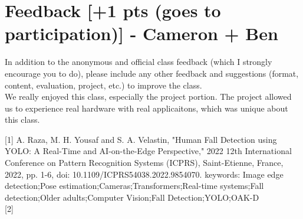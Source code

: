 \documentclass[sigconf,authorversion,nonacm]{acmart}
\begin{document}
\section{Feedback {\small {[+1 pts (goes to participation)]}} - Cameron + Ben}  
In addition to the anonymous and official class feedback (which I strongly encourage you to do), please include any other feedback and suggestions (format, content, evaluation, project, etc.) to improve the class. \\

We really enjoyed this class, especially the project portion. The project allowed us to experience real hardware with real applicaitons, which was unique about this class.




[1] A. Raza, M. H. Yousaf and S. A. Velastin, "Human Fall Detection using YOLO: A Real-Time and AI-on-the-Edge Perspective," 2022 12th International Conference on Pattern Recognition Systems (ICPRS), Saint-Etienne, France, 2022, pp. 1-6, doi: 10.1109/ICPRS54038.2022.9854070. keywords: {Image edge detection;Pose estimation;Cameras;Transformers;Real-time systems;Fall detection;Older adults;Computer Vision;Fall Detection;YOLO;OAK-D} \\

[2]
\end{document}
